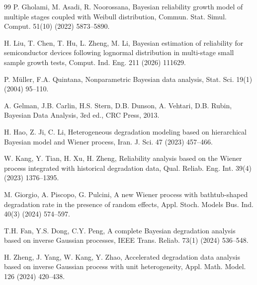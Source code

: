 \documentclass[a4paper,fleqn,longmktitle]{cas-sc}
\begin{document}
\begin{thebibliography}{99}
P. Gholami, M. Asadi, R. Noorossana, Bayesian reliability growth model of multiple stages coupled with Weibull distribution, Commun. Stat. Simul. Comput. 51(10) (2022) 5873--5890.





H. Liu, T. Chen, T. Hu, L. Zheng, M. Li, Bayesian estimation of reliability for semiconductor devices following lognormal distribution in multi-stage small sample growth tests, Comput. Ind. Eng. 211 (2026) 111629.





P. M\"uller, F.A. Quintana, Nonparametric Bayesian data analysis, Stat. Sci. 19(1) (2004) 95--110.





A. Gelman, J.B. Carlin, H.S. Stern, D.B. Dunson, A. Vehtari, D.B. Rubin, Bayesian Data Analysis, 3rd ed., CRC Press, 2013.





H. Hao, Z. Ji, C. Li, Heterogeneous degradation modeling based on hierarchical Bayesian model and Wiener process, Iran. J. Sci. 47 (2023) 457--466.





W. Kang, Y. Tian, H. Xu, H. Zheng, Reliability analysis based on the Wiener process integrated with historical degradation data, Qual. Reliab. Eng. Int. 39(4) (2023) 1376--1395.





M. Giorgio, A. Piscopo, G. Pulcini, A new Wiener process with bathtub-shaped degradation rate in the presence of random effects, Appl. Stoch. Models Bus. Ind. 40(3) (2024) 574--597.





T.H. Fan, Y.S. Dong, C.Y. Peng, A complete Bayesian degradation analysis based on inverse Gaussian processes, IEEE Trans. Reliab. 73(1) (2024) 536--548.





H. Zheng, J. Yang, W. Kang, Y. Zhao, Accelerated degradation data analysis based on inverse Gaussian process with unit heterogeneity, Appl. Math. Model. 126 (2024) 420--438.






\end{thebibliography}
\end{document}
